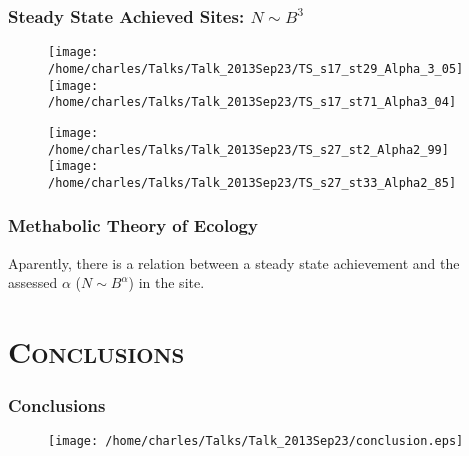 \documentclass[xcolor=x11names,compress]{beamer}
\renewcommand{\(}{\begin{columns}}
\renewcommand{\)}{\end{columns}}
\newcommand{\<}[1]{\begin{column}{#1}}
\renewcommand{\>}{\end{column}}
\begin{document}
\begin{frame}
\frametitle{Steady State Achieved Sites: $N \sim B^{3}$}
\begin{figure}
\texttt{[image: /home/charles/Talks/Talk\_2013Sep23/TS\_s17\_st29\_Alpha\_3\_05]}
\texttt{[image: /home/charles/Talks/Talk\_2013Sep23/TS\_s17\_st71\_Alpha3\_04]}
\end{figure}
\begin{figure}
\texttt{[image: /home/charles/Talks/Talk\_2013Sep23/TS\_s27\_st2\_Alpha2\_99]}
\texttt{[image: /home/charles/Talks/Talk\_2013Sep23/TS\_s27\_st33\_Alpha2\_85]}
\end{figure}
\end{frame}

\begin{frame}
\frametitle{Methabolic Theory of Ecology}
\begin{block}{}
Aparently, there is a relation between a steady state achievement and the assessed $\alpha$ ($N \sim B^{\alpha}$) in the site. 
\end{block}
\end{frame}




\section{\scshape Conclusions}

\begin{frame}
\frametitle{Conclusions}
   \begin{figure}
	\texttt{[image: /home/charles/Talks/Talk\_2013Sep23/conclusion.eps]}
   \end{figure}
\end{frame}
\end{document}
